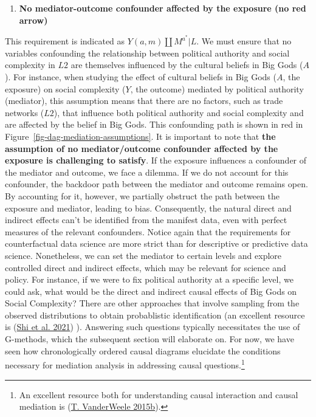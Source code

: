 \documentclass[
  singlecolumn]{report}
\providecommand{\tightlist}{%
  \setlength{\itemsep}{0pt}\setlength{\parskip}{0pt}}\usepackage{longtable,booktabs,array}
\begin{document}
\begin{enumerate}
\def\labelenumi{\arabic{enumi}.}
\setcounter{enumi}{3}
\tightlist
\item
  \textbf{No mediator-outcome confounder affected by the exposure (no
  red arrow)}
\end{enumerate}

This requirement is indicated as \(Y(a,m) \coprod M^{a^*} | L\). We must
ensure that no variables confounding the relationship between political
authority and social complexity in \(L2\) are themselves influenced by
the cultural beliefs in Big Gods (\(A\)). For instance, when studying
the effect of cultural beliefs in Big Gods (\(A\), the exposure) on
social complexity (\(Y\), the outcome) mediated by political authority
(mediator), this assumption means that there are no factors, such as
trade networks (\(L2\)), that influence both political authority and
social complexity and are affected by the belief in Big Gods. This
confounding path is shown in red in
Figure~\ref{fig-dag-mediation-assumptions}. It is important to note that
\textbf{the assumption of no mediator/outcome confounder affected by the
exposure is challenging to satisfy}. If the exposure influences a
confounder of the mediator and outcome, we face a dilemma. If we do not
account for this confounder, the backdoor path between the mediator and
outcome remains open. By accounting for it, however, we partially
obstruct the path between the exposure and mediator, leading to bias.
Consequently, the natural direct and indirect effects can't be
identified from the manifest data, even with perfect measures of the
relevant confounders. Notice again that the requirements for
counterfactual data science are more strict than for descriptive or
predictive data science. Nonetheless, we can set the mediator to certain
levels and explore controlled direct and indirect effects, which may be
relevant for science and policy. For instance, if we were to fix
political authority at a specific level, we could ask, what would be the
direct and indirect causal effects of Big Gods on Social Complexity?
There are other approaches that involve sampling from the observed
distributions to obtain probablistic identification (an excellent
resource is (\protect\hyperlink{ref-shi2021}{Shi et al. 2021}) ).
Answering such questions typically necessitates the use of G-methods,
which the subsequent section will elaborate on. For now, we have seen
how chronologically ordered causal diagrams elucidate the conditions
necessary for mediation analysis in addressing causal
questions.\footnote{An excellent resource both for understanding causal
  interaction and causal mediation is
  (\protect\hyperlink{ref-vanderweele2015a}{T. VanderWeele 2015b}).}
\end{document}
